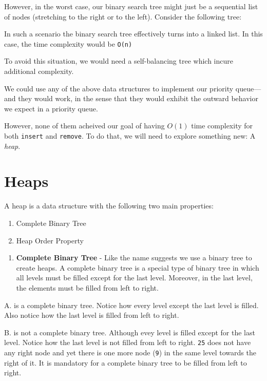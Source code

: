 \documentclass[11pt]{article}
\providecommand{\tightlist}{%
      \setlength{\itemsep}{0pt}\setlength{\parskip}{0pt}}
\begin{document}
However, in the worst case, our binary search tree might just be a
sequential list of nodes (stretching to the right or to the left).
Consider the following tree:

In such a scenario the binary search tree effectively turns into a
linked list. In this case, the time complexity would be \texttt{O(n)}

To avoid this situation, we would need a self-balancing tree which
incure additional complexity.

We could use any of the above data structures to implement our priority
queue---and they would work, in the sense that they would exhibit the
outward behavior we expect in a priority queue.

However, none of them acheived our goal of having \(O(1)\) time
complexity for both \texttt{insert} and \texttt{remove}. To do that, we
will need to explore something new: A \emph{heap}.

    \section{Heaps}\label{heaps}

A heap is a data structure with the following two main properties:

\begin{enumerate}
\def\labelenumi{\arabic{enumi}.}
\tightlist
\item
  Complete Binary Tree
\item
  Heap Order Property
\end{enumerate}

    \begin{enumerate}
\def\labelenumi{\arabic{enumi}.}
\tightlist
\item
  \textbf{Complete Binary Tree} - Like the name suggests we use a binary
  tree to create heaps. A complete binary tree is a special type of
  binary tree in which all levels must be filled except for the last
  level. Moreover, in the last level, the elements must be filled from
  left to right.
\end{enumerate}

A. is a complete binary tree. Notice how every level except the last
level is filled. Also notice how the last level is filled from left to
right.

B. is not a complete binary tree. Although evey level is filled except
for the last level. Notice how the last level is not filled from left to
right. \texttt{25} does not have any right node and yet there is one
more node (\texttt{9}) in the same level towards the right of it. It is
mandatory for a complete binary tree to be filled from left to right.
\end{document}
